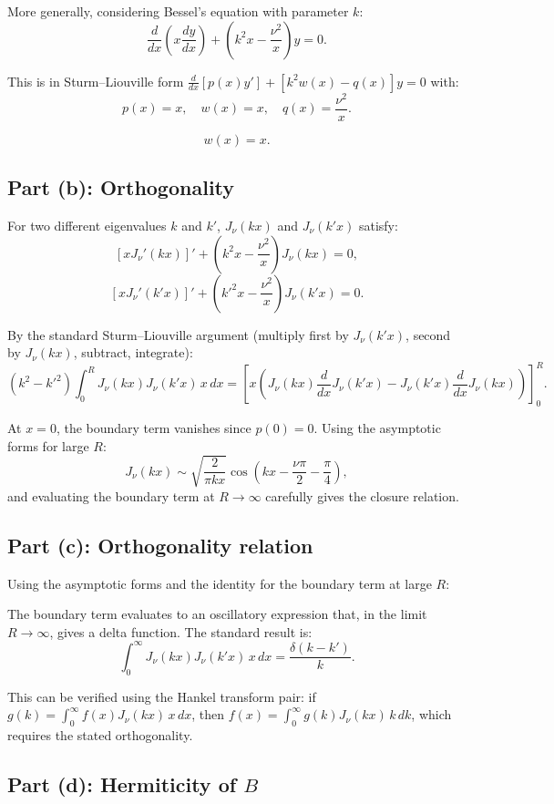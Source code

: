 \documentclass[12pt]{article}
\begin{document}
More generally, considering Bessel's equation with parameter $k$:
\[
\frac{d}{dx}\left(x\frac{dy}{dx}\right) + \left(k^2 x - \frac{\nu^2}{x}\right)y = 0.
\]

This is in Sturm--Liouville form $\frac{d}{dx}[p(x)y'] + [k^2 w(x) - q(x)]y = 0$ with:
\[
p(x) = x, \quad w(x) = x, \quad q(x) = \frac{\nu^2}{x}.
\]

\[
\boxed{w(x) = x.}
\]

\subsection*{Part (b): Orthogonality}

For two different eigenvalues $k$ and $k'$, $J_\nu(kx)$ and $J_\nu(k'x)$ satisfy:
\[
[xJ_\nu'(kx)]' + \left(k^2 x - \frac{\nu^2}{x}\right)J_\nu(kx) = 0,
\]
\[
[xJ_\nu'(k'x)]' + \left(k'^2 x - \frac{\nu^2}{x}\right)J_\nu(k'x) = 0.
\]

By the standard Sturm--Liouville argument (multiply first by $J_\nu(k'x)$, second by $J_\nu(kx)$, subtract, integrate):
\[
(k^2 - k'^2)\int_0^R J_\nu(kx)J_\nu(k'x)\,x\,dx = \left[x\left(J_\nu(kx)\frac{d}{dx}J_\nu(k'x) - J_\nu(k'x)\frac{d}{dx}J_\nu(kx)\right)\right]_0^R.
\]

At $x = 0$, the boundary term vanishes since $p(0) = 0$. Using the asymptotic forms for large $R$:
\[
J_\nu(kx) \sim \sqrt{\frac{2}{\pi kx}}\cos\left(kx - \frac{\nu\pi}{2}-\frac{\pi}{4}\right),
\]
and evaluating the boundary term at $R \to \infty$ carefully gives the closure relation.

\subsection*{Part (c): Orthogonality relation}

Using the asymptotic forms and the identity for the boundary term at large $R$:

The boundary term evaluates to an oscillatory expression that, in the limit $R \to \infty$, gives a delta function. The standard result is:
\[
\boxed{\int_0^{\infty}J_\nu(kx)J_\nu(k'x)\,x\,dx = \frac{\delta(k-k')}{k}.}
\]

This can be verified using the Hankel transform pair: if $g(k) = \int_0^\infty f(x)J_\nu(kx)\,x\,dx$, then $f(x) = \int_0^\infty g(k)J_\nu(kx)\,k\,dk$, which requires the stated orthogonality.

\subsection*{Part (d): Hermiticity of $B$}
\end{document}
